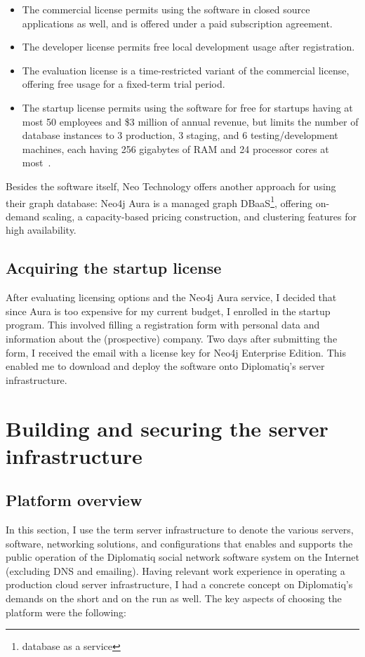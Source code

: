 \begin{itemize}
\item The commercial license permits using the software in closed source applications as well, and is offered under a paid subscription agreement.
\item The developer license permits free local development usage after registration.
\item The evaluation license is a time-restricted variant of the commercial license, offering free usage for a fixed-term trial period.
\item The startup license permits using the software for free for startups having at most 50 employees and \$3 million of annual revenue, but limits the number of database instances to 3 production, 3 staging, and 6 testing/development machines, each having 256 gigabytes of RAM and 24 processor cores at most~\cite{neo4j-startup-program}.
\end{itemize}

Besides the software itself, Neo Technology offers another approach for using their graph database: Neo4j Aura is a managed graph DBaaS\footnote{database as a service}, offering on-demand scaling, a capacity-based pricing construction, and clustering features for high availability.

\subsection{Acquiring the startup license}

After evaluating licensing options and the Neo4j Aura service, I decided that since Aura is too expensive for my current budget, I enrolled in the startup program. This involved filling a registration form with personal data and information about the (prospective) company. Two days after submitting the form, I received the email with a license key for Neo4j Enterprise Edition. This enabled me to download and deploy the software onto Diplomatiq's server infrastructure.

\section{Building and securing the server infrastructure}

\subsection{Platform overview}

In this section, I use the term server infrastructure to denote the various servers, software, networking solutions, and configurations that enables and supports the public operation of the Diplomatiq social network software system on the Internet (excluding DNS and emailing). Having relevant work experience in operating a production cloud server infrastructure, I had a concrete concept on Diplomatiq's demands on the short and on the run as well. The key aspects of choosing the platform were the following:

